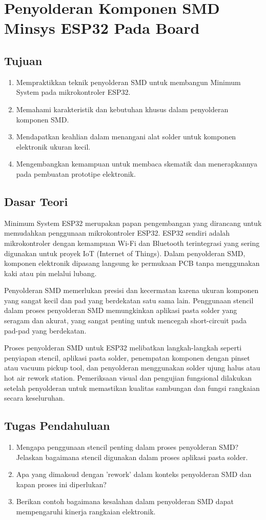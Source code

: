 \chapter{Penyolderan Komponen SMD Minsys ESP32 Pada Board}

\section{Tujuan}
\begin{enumerate}
    \item Mempraktikkan teknik penyolderan SMD untuk membangun Minimum System pada mikrokontroler ESP32.
    \item Memahami karakteristik dan kebutuhan khusus dalam penyolderan komponen SMD.
    \item Mendapatkan keahlian dalam menangani alat solder untuk komponen elektronik ukuran kecil.
    \item Mengembangkan kemampuan untuk membaca skematik dan menerapkannya pada pembuatan prototipe elektronik.
\end{enumerate}

\section{Dasar Teori}
Minimum System ESP32 merupakan papan pengembangan yang dirancang untuk memudahkan penggunaan mikrokontroler ESP32. ESP32 sendiri adalah mikrokontroler dengan kemampuan Wi-Fi dan Bluetooth terintegrasi yang sering digunakan untuk proyek IoT (Internet of Things). Dalam penyolderan SMD, komponen elektronik dipasang langsung ke permukaan PCB tanpa menggunakan kaki atau pin melalui lubang. 

Penyolderan SMD memerlukan presisi dan kecermatan karena ukuran komponen yang sangat kecil dan pad yang berdekatan satu sama lain. Penggunaan stencil dalam proses penyolderan SMD memungkinkan aplikasi pasta solder yang seragam dan akurat, yang sangat penting untuk mencegah short-circuit pada pad-pad yang berdekatan.

Proses penyolderan SMD untuk ESP32 melibatkan langkah-langkah seperti penyiapan stencil, aplikasi pasta solder, penempatan komponen dengan pinset atau vacuum pickup tool, dan penyolderan menggunakan solder ujung halus atau hot air rework station. Pemeriksaan visual dan pengujian fungsional dilakukan setelah penyolderan untuk memastikan kualitas sambungan dan fungsi rangkaian secara keseluruhan.

\section{Tugas Pendahuluan}
\begin{enumerate}
    \item Mengapa penggunaan stencil penting dalam proses penyolderan SMD? Jelaskan bagaimana stencil digunakan dalam proses aplikasi pasta solder.
    \item Apa yang dimaksud dengan 'rework' dalam konteks penyolderan SMD dan kapan proses ini diperlukan?
    \item Berikan contoh bagaimana kesalahan dalam penyolderan SMD dapat mempengaruhi kinerja rangkaian elektronik.
\end{enumerate}

